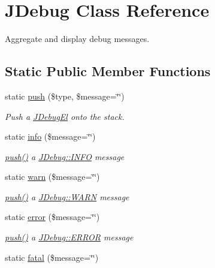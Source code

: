 \hypertarget{classJDebug}{\section{J\-Debug Class Reference}
\label{classJDebug}
}


Aggregate and display debug messages.  


\subsection*{Static Public Member Functions}
\begin{DoxyCompactItemize}
\item 
static \hyperlink{classJDebug_ab101f91b0ab2610344e8efdb0fadb702}{push} (\$type, \$message=\char`\"{}\char`\"{})
\begin{DoxyCompactList}\small\item\em Push a \hyperlink{classJDebugEl}{J\-Debug\-El} onto the stack. \end{DoxyCompactList}\item 
static \hyperlink{classJDebug_a222c0ea0549000815f8476cc2a4716b8}{info} (\$message=\char`\"{}\char`\"{})
\begin{DoxyCompactList}\small\item\em \hyperlink{classJDebug_ab101f91b0ab2610344e8efdb0fadb702}{push()} a \hyperlink{classJDebug_ab1d6744a646820f740a6239c87cdac2e}{J\-Debug\-::\-I\-N\-F\-O} message \end{DoxyCompactList}\item 
static \hyperlink{classJDebug_a081139aaf3ffc7fd75d7d41cfc87c97d}{warn} (\$message=\char`\"{}\char`\"{})
\begin{DoxyCompactList}\small\item\em \hyperlink{classJDebug_ab101f91b0ab2610344e8efdb0fadb702}{push()} a \hyperlink{classJDebug_a2b9e40889ea875bb6703be05e2f1113b}{J\-Debug\-::\-W\-A\-R\-N} message \end{DoxyCompactList}\item 
static \hyperlink{classJDebug_ad1d1dac056fc18682e336c592cc324bc}{error} (\$message=\char`\"{}\char`\"{})
\begin{DoxyCompactList}\small\item\em \hyperlink{classJDebug_ab101f91b0ab2610344e8efdb0fadb702}{push()} a \hyperlink{classJDebug_a1b7962d9b5ceaeb5ed07fbf6cddb959d}{J\-Debug\-::\-E\-R\-R\-O\-R} message \end{DoxyCompactList}\item 
\hypertarget{classJDebug_a7fe87c3f373fe6086f6a0a63789bec10}{static \hyperlink{classJDebug_a7fe87c3f373fe6086f6a0a63789bec10}{fatal} (\$message=\char`\"{}\char`\"{})}\label{classJDebug_a7fe87c3f373fe6086f6a0a63789bec10}


\end{DoxyCompactItemize}
